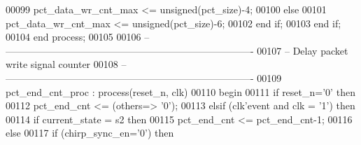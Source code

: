 \begin{DoxyCode}
00099          \textcolor{vhdlchar}{pct_data_wr_cnt_max} \textcolor{vhdlchar}{<=} \textcolor{comment}{unsigned}\textcolor{vhdlchar}{(}\textcolor{vhdlchar}{pct_size}\textcolor{vhdlchar}{)}\textcolor{vhdlchar}{-}\textcolor{vhdllogic}{}\textcolor{vhdllogic}{4};
00100             \textcolor{keywordflow}{else}
00101             \textcolor{vhdlchar}{pct_data_wr_cnt_max} \textcolor{vhdlchar}{<=} \textcolor{comment}{unsigned}\textcolor{vhdlchar}{(}\textcolor{vhdlchar}{pct_size}\textcolor{vhdlchar}{)}\textcolor{vhdlchar}{-}\textcolor{vhdllogic}{}\textcolor{vhdllogic}{6};
00102             \textcolor{keywordflow}{end} \textcolor{keywordflow}{if};
00103       \textcolor{keywordflow}{end} \textcolor{keywordflow}{if};
00104    \textcolor{keywordflow}{end} \textcolor{keywordflow}{process};
00105 
00106 \textcolor{keyword}{-- ----------------------------------------------------------------------------}
00107 \textcolor{keyword}{-- Delay packet write signal counter}
00108 \textcolor{keyword}{-- ----------------------------------------------------------------------------     }
00109 pct\_end\_cnt\_proc : \textcolor{keywordflow}{process}(reset_n, clk)
00110 \textcolor{vhdlkeyword}{   begin}
00111       \textcolor{keywordflow}{if} \textcolor{vhdlchar}{reset_n}\textcolor{vhdlchar}{=}\textcolor{vhdlchar}{'}\textcolor{vhdllogic}{}\textcolor{vhdllogic}{0}\textcolor{vhdlchar}{'} \textcolor{keywordflow}{then}
00112          \textcolor{vhdlchar}{pct_end_cnt} \textcolor{vhdlchar}{<=} \textcolor{vhdlchar}{(}\textcolor{keywordflow}{others}\textcolor{vhdlchar}{=}\textcolor{vhdlchar}{>} \textcolor{vhdlchar}{'}\textcolor{vhdllogic}{}\textcolor{vhdllogic}{0}\textcolor{vhdlchar}{'}\textcolor{vhdlchar}{)};
00113       \textcolor{keywordflow}{elsif} \textcolor{vhdlchar}{(}\textcolor{vhdlchar}{clk}\textcolor{vhdlchar}{'}\textcolor{vhdlkeyword}{event} \textcolor{keywordflow}{and} \textcolor{vhdlchar}{clk} \textcolor{vhdlchar}{=} \textcolor{vhdlchar}{'}\textcolor{vhdllogic}{}\textcolor{vhdllogic}{1}\textcolor{vhdlchar}{'}\textcolor{vhdlchar}{)} \textcolor{keywordflow}{then}
00114          \textcolor{keywordflow}{if} \textcolor{vhdlchar}{current_state} \textcolor{vhdlchar}{=} \textcolor{vhdlchar}{s2} \textcolor{keywordflow}{then}
00115             \textcolor{vhdlchar}{pct_end_cnt} \textcolor{vhdlchar}{<=} \textcolor{vhdlchar}{pct_end_cnt}\textcolor{vhdlchar}{-}\textcolor{vhdllogic}{}\textcolor{vhdllogic}{1};
00116          \textcolor{keywordflow}{else}
00117                 \textcolor{keywordflow}{if} \textcolor{vhdlchar}{(}\textcolor{vhdlchar}{chirp_sync_en}\textcolor{vhdlchar}{=}\textcolor{vhdlchar}{'}\textcolor{vhdllogic}{}\textcolor{vhdllogic}{0}\textcolor{vhdlchar}{'}\textcolor{vhdlchar}{)} \textcolor{keywordflow}{then}

\end{DoxyCode}
